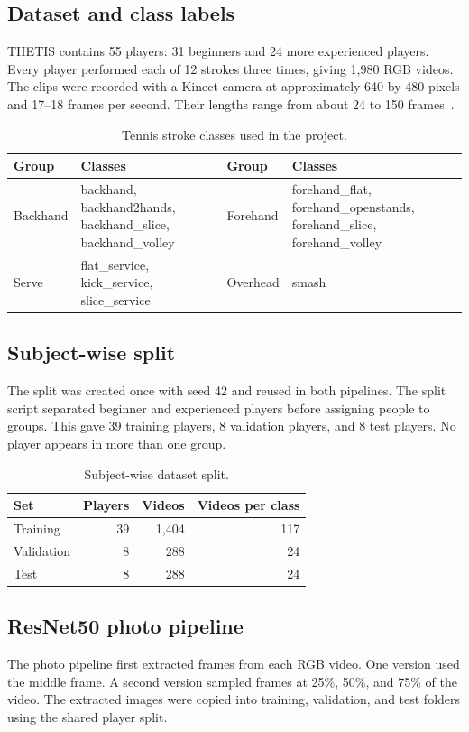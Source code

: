 \documentclass[12pt,a4paper]{article}
\begin{document}
\subsection{Dataset and class labels}
THETIS contains 55 players: 31 beginners and 24 more experienced players. Every player performed each of 12 strokes three times, giving 1,980 RGB videos. The clips were recorded with a Kinect camera at approximately 640 by 480 pixels and 17--18 frames per second. Their lengths range from about 24 to 150 frames~\cite{gourgari2013thetis}.

\begin{table}[H]
\centering
\caption{Tennis stroke classes used in the project.}
\begin{tabularx}{\textwidth}{lY lY}
\toprule
\textbf{Group} & \textbf{Classes} & \textbf{Group} & \textbf{Classes} \\
\midrule
Backhand & backhand, backhand2hands, backhand\_slice, backhand\_volley & Forehand & forehand\_flat, forehand\_openstands, forehand\_slice, forehand\_volley \\
Serve & flat\_service, kick\_service, slice\_service & Overhead & smash \\
\bottomrule
\end{tabularx}
\end{table}

\subsection{Subject-wise split}
The split was created once with seed 42 and reused in both pipelines. The split script separated beginner and experienced players before assigning people to groups. This gave 39 training players, 8 validation players, and 8 test players. No player appears in more than one group.

\begin{table}[H]
\centering
\caption{Subject-wise dataset split.}
\begin{tabular}{lrrr}
\toprule
\textbf{Set} & \textbf{Players} & \textbf{Videos} & \textbf{Videos per class} \\
\midrule
Training & 39 & 1,404 & 117 \\
Validation & 8 & 288 & 24 \\
Test & 8 & 288 & 24 \\
\bottomrule
\end{tabular}
\end{table}

\subsection{ResNet50 photo pipeline}
The photo pipeline first extracted frames from each RGB video. One version used the middle frame. A second version sampled frames at 25\%, 50\%, and 75\% of the video. The extracted images were copied into training, validation, and test folders using the shared player split.
\end{document}

